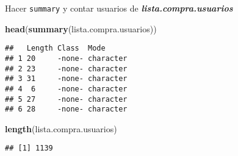 \documentclass[
  ignorenonframetext,
]{beamer}
\newenvironment{Shaded}{\begin{snugshade}}{\end{snugshade}}
\newcommand{\KeywordTok}[1]{\textcolor[rgb]{0.13,0.29,0.53}{\textbf{#1}}}
\newcommand{\NormalTok}[1]{#1}
\begin{document}
\begin{frame}[fragile]{Hacer \texttt{summary} y contar usuarios de
\textbf{\emph{lista.compra.usuarios}}}
\protect\hypertarget{hacer-summary-y-contar-usuarios-de-lista.compra.usuarios}{}

\begin{Shaded}
\begin{Highlighting}[]
\KeywordTok{head}\NormalTok{(}\KeywordTok{summary}\NormalTok{(lista.compra.usuarios))}
\end{Highlighting}
\end{Shaded}

\begin{verbatim}
##   Length Class  Mode     
## 1 20     -none- character
## 2 23     -none- character
## 3 31     -none- character
## 4  6     -none- character
## 5 27     -none- character
## 6 28     -none- character
\end{verbatim}

\begin{Shaded}
\begin{Highlighting}[]
\KeywordTok{length}\NormalTok{(lista.compra.usuarios)}
\end{Highlighting}
\end{Shaded}

\begin{verbatim}
## [1] 1139
\end{verbatim}

\end{frame}
\end{document}

